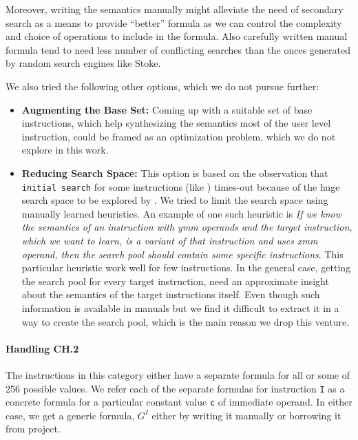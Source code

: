    Moreover, writing the semantics manually might alleviate the need of
   secondary search as a means to provide ``better'' formula as we can control
   the complexity and choice of operations to include in the formula. Also
   carefully written manual formula tend to need less number of conflicting
   searches than the onces generated by random search engines like Stoke.
   
   We also tried the following other options, which we do not pursue further:
   \begin{itemize}
       \item \textbf{Augmenting the Base Set: }
       Coming up with a suitable set of base instructions, which help 
       synthesizing the semantics most of the user level instruction, could be framed 
       as an optimization problem, which we do not explore in this work.  
       
       \item \textbf{Reducing \Stoke Search Space: }This option is based
       on the observation that {\tt initial search} for some instructions (like
       ) times-out because of the
       huge search space to be explored by \Stoke. We tried to limit the search
       space using manually learned heuristics. An example of one such heuristic is
       \emph{ If we know the semantics of an instruction with ymm operands and the
           target instruction, which we want to learn, is a variant of that
           instruction and uses xmm operand, then the search pool should contain
           some specific instructions}. This particular heuristic  work well for few
       instructions. In the general case, getting the search pool for every
       target instruction, need an approximate insight about the semantics of
       the target instructions itself. Even though such information is available
       in manuals but we find it difficult to extract it in a way to create the
       search pool, which is the main reason we drop this venture.
   \end{itemize} 
    
   
   
   
   
   \paragraph{Handling CH.2} The instructions in this category either  have a
   separate formula for all or some of 256 possible values. We refer each of the
   separate formulas for instruction {\tt I} as a concrete formula  for
   a particular constant value {\tt c} of immediate operand.  In either case, we
   get a generic formula, $G^I$ either by writing it manually or borrowing it
   from  \Stoke project.
   
